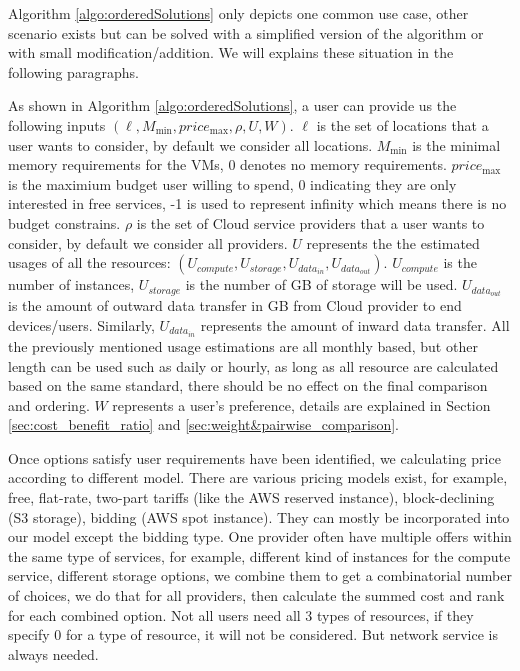 Algorithm \ref{algo:orderedSolutions} only depicts one common use case, other scenario exists but can be solved with a simplified version of the algorithm or with small modification/addition. We will explains these situation in the following paragraphs.

As shown in Algorithm \ref{algo:orderedSolutions}, a user can provide us the following inputs $( \ell , M_{\min } , price_{\max} , \rho , U , W )$. $\ell$ is the set of locations that a user wants to consider, by default we consider all locations. $M_{\min}$ is the minimal memory requirements for the VMs, 0 denotes no memory requirements. $price_{\max}$ is the maximium budget user willing to spend, 0 indicating they are only interested in free services, -1 is used to represent infinity which means there is no budget constrains. $\rho$ is the set of Cloud service providers that a user wants to consider, by default we consider all providers. $U$ represents the the estimated usages of all the resources: $( U_{compute} , U_{storage} , U_{data_{in}} , U_{data_{out}} )$. $U_{compute}$ is the number of instances, $U_{storage}$ is the number of GB of storage will be used. $U_{data_{out}}$ is the amount of outward data transfer in GB from Cloud provider to end devices/users. Similarly, $U_{data_{in}}$ represents the amount of inward data transfer. All the previously mentioned usage estimations are all monthly based, but other length can be used such as daily or hourly, as long as all resource are calculated based on the same standard, there should be no effect on the final comparison and ordering. $W$ represents a user's preference, details are explained in Section \ref{sec:cost_benefit_ratio} and \ref{sec:weight&pairwise_comparison}.

Once options satisfy user requirements have been identified, we calculating price according to different model. There are various pricing models    \cite{weinman2011axiomatic} exist, for example, free, flat-rate, two-part tariffs (like the AWS reserved instance), block-declining (S3 storage), bidding (AWS spot instance). They can mostly be incorporated into our model except the bidding type. One provider often have multiple offers within the same type of services, for example, different kind of instances for the compute service, different storage options, we combine them to get a combinatorial number of choices, we do that for all providers, then calculate the summed cost and rank for each combined option. Not all users need all 3 types of resources, if they specify 0 for a type of resource, it will not be considered. But network service is always needed.

